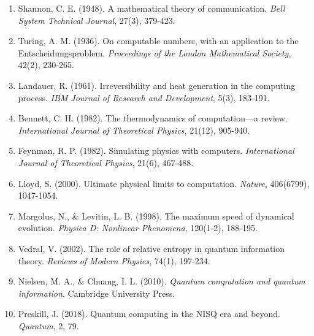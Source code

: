 \documentclass[12pt,a4paper]{article}
\begin{document}
\begin{enumerate}
\item Shannon, C. E. (1948). A mathematical theory of communication. \textit{Bell System Technical Journal}, 27(3), 379-423.
\item Turing, A. M. (1936). On computable numbers, with an application to the Entscheidungsproblem. \textit{Proceedings of the London Mathematical Society}, 42(2), 230-265.
\item Landauer, R. (1961). Irreversibility and heat generation in the computing process. \textit{IBM Journal of Research and Development}, 5(3), 183-191.
\item Bennett, C. H. (1982). The thermodynamics of computation—a review. \textit{International Journal of Theoretical Physics}, 21(12), 905-940.
\item Feynman, R. P. (1982). Simulating physics with computers. \textit{International Journal of Theoretical Physics}, 21(6), 467-488.
\item Lloyd, S. (2000). Ultimate physical limits to computation. \textit{Nature}, 406(6799), 1047-1054.
\item Margolus, N., & Levitin, L. B. (1998). The maximum speed of dynamical evolution. \textit{Physica D: Nonlinear Phenomena}, 120(1-2), 188-195.
\item Vedral, V. (2002). The role of relative entropy in quantum information theory. \textit{Reviews of Modern Physics}, 74(1), 197-234.
\item Nielsen, M. A., & Chuang, I. L. (2010). \textit{Quantum computation and quantum information}. Cambridge University Press.
\item Preskill, J. (2018). Quantum computing in the NISQ era and beyond. \textit{Quantum}, 2, 79.
\end{enumerate}
\end{document}
